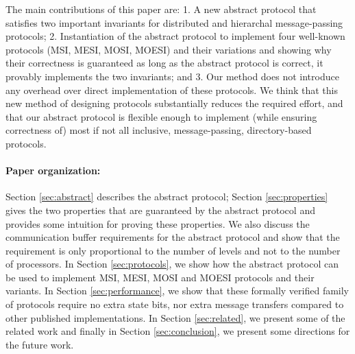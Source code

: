 The main contributions of this paper are: 1. A new abstract protocol that
satisfies two important invariants for distributed and hierarchal
message-passing protocols; 2. Instantiation of the abstract protocol to
implement four well-known protocols (MSI, MESI, MOSI, MOESI) and their
variations and showing why their correctness is guaranteed as long as the
abstract protocol is correct, \ie it provably implements the two invariants;
and 3. Our method does not introduce any overhead over direct implementation of
these protocols.  We think that this new method of designing protocols
substantially reduces the required effort, and that our abstract protocol is
flexible enough to implement (while ensuring correctness of) most if not all
inclusive, message-passing, directory-based protocols.

\paragraph{Paper organization:} Section \ref{sec:abstract} describes the abstract
protocol; Section \ref{sec:properties} gives the two properties that are
guaranteed by the abstract protocol and provides some intuition for proving
these properties. We also discuss the communication buffer requirements for the
abstract protocol and show that the requirement is only proportional to the
number of levels and not to the number of processors. In Section
\ref{sec:protocols}, we show how the abstract protocol can be used to implement
MSI, MESI, MOSI and MOESI protocols and their variants. In Section
\ref{sec:performance}, we show that these formally verified family of protocols
require no extra state bits, nor extra message transfers compared to other
published implementations. In Section \ref{sec:related}, we present some of the
related work and finally in Section \ref{sec:conclusion}, we present some
directions for the future work.
